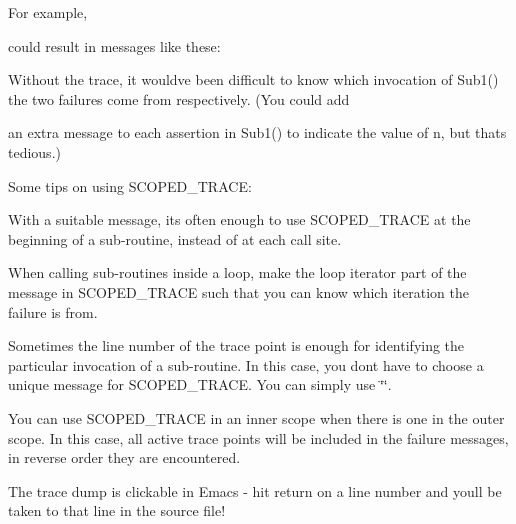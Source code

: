 For example,


\begin{DoxyCode}{0}
\end{DoxyCode}


could result in messages like these\+:


\begin{DoxyCode}{0}
\DoxyCodeLine{}
\end{DoxyCode}


Without the trace, it would\textquotesingle{}ve been difficult to know which invocation of {\ttfamily Sub1()} the two failures come from respectively. (You could add

an extra message to each assertion in {\ttfamily Sub1()} to indicate the value of {\ttfamily n}, but that\textquotesingle{}s tedious.)

Some tips on using {\ttfamily S\+C\+O\+P\+E\+D\+\_\+\+T\+R\+A\+CE}\+:


\begin{DoxyEnumerate}
\item With a suitable message, it\textquotesingle{}s often enough to use {\ttfamily S\+C\+O\+P\+E\+D\+\_\+\+T\+R\+A\+CE} at the beginning of a sub-\/routine, instead of at each call site.
\item When calling sub-\/routines inside a loop, make the loop iterator part of the message in {\ttfamily S\+C\+O\+P\+E\+D\+\_\+\+T\+R\+A\+CE} such that you can know which iteration the failure is from.
\item Sometimes the line number of the trace point is enough for identifying the particular invocation of a sub-\/routine. In this case, you don\textquotesingle{}t have to choose a unique message for {\ttfamily S\+C\+O\+P\+E\+D\+\_\+\+T\+R\+A\+CE}. You can simply use {\ttfamily \char`\"{}\char`\"{}}.
\item You can use {\ttfamily S\+C\+O\+P\+E\+D\+\_\+\+T\+R\+A\+CE} in an inner scope when there is one in the outer scope. In this case, all active trace points will be included in the failure messages, in reverse order they are encountered.
\item The trace dump is clickable in Emacs -\/ hit {\ttfamily return} on a line number and you\textquotesingle{}ll be taken to that line in the source file!
\end{DoxyEnumerate}

